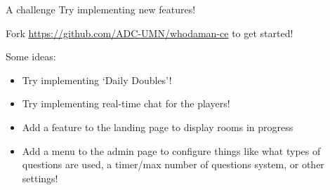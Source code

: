 \documentclass{beamer}
\begin{document}
\begin{frame}{A challenge}
	Try implementing new features!

	\pause

	\bigskip

	Fork \href{https://github.com/ADC-UMN/whodaman-ce}{https://github.com/ADC-UMN/whodaman-ce} to get started!

	\pause

	\bigskip

	Some ideas:
	\begin{itemize}
		\item Try implementing `Daily Doubles'! \pause
		\item Try implementing real-time chat for the players! \pause
		\item Add a feature to the landing page to display rooms in progress \pause
		\item Add a menu to the admin page to configure things like what types of questions are used, a timer/max number of questions system, or other settings!
	\end{itemize}
\end{frame}
\end{document}
